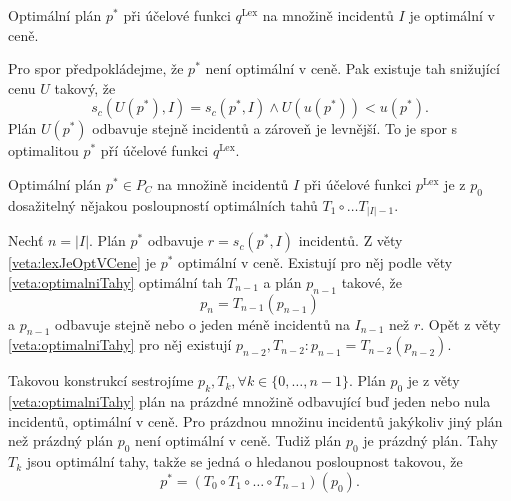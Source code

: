 \begin{veta}\label{veta:lexJeOptVCene}
  Optimální plán $p^*$ při účelové funkci $q^{\text{Lex}}$ na množině incidentů $I$ je optimální v ceně.
\end{veta}
\begin{dukaz}
  Pro spor předpokládejme, že $p^*$ není optimální v ceně.
  Pak existuje tah snižující cenu $U$ takový, že
  \begin{equation*}
    s_c(U(p^*), I) = s_c(p^*, I) \land U(u(p^*)) < u(p^*).
  \end{equation*}
  Plán $U(p^*)$ odbavuje stejně incidentů a zároveň je levnější.
  To je spor s optimalitou $p^*$ pří účelové funkci $q^{\text{Lex}}$.
\end{dukaz}

\begin{veta}\label{veta:dosazitelnostOptimalnimiTahy}
  Optimální plán $p^* \in P_C$ na množině incidentů $I$ při účelové funkci $p^{\text{Lex}}$ je z $p_0$ dosažitelný nějakou posloupností optimálních tahů $T_1 \circ \dots T_{|I|-1}$.
\end{veta}
\begin{dukaz}
  Nechť $n = |I|$.
  Plán $p^*$ odbavuje $r = s_c(p^*, I)$ incidentů.
  Z věty \ref{veta:lexJeOptVCene} je $p^*$ optimální v ceně.
  Existují pro něj podle věty \ref{veta:optimalniTahy} optimální tah $T_{n-1}$ a plán $p_{n-1}$ takové, že
  \begin{equation*}
    p_n = T_{n-1}(p_{n-1})
  \end{equation*}
  a $p_{n-1}$ odbavuje stejně nebo o jeden méně incidentů na $I_{n-1}$ než $r$.
  Opět z věty \ref{veta:optimalniTahy} pro něj existují $p_{n-2}, T_{n-2} \colon p_{n-1} = T_{n-2}(p_{n-2})$.

  Takovou konstrukcí sestrojíme $p_{k}, T_{k}, \forall k \in \{ 0, \dots, n-1 \}$. 
  Plán $p_0$ je z věty \ref{veta:optimalniTahy} plán na prázdné množině odbavující buď jeden nebo nula incidentů, optimální v ceně.
  Pro prázdnou množinu incidentů jakýkoliv jiný plán než prázdný plán $p_0$ není optimální v ceně.
  Tudiž plán $p_0$ je prázdný plán.
  Tahy $T_k$ jsou optimální tahy, takže se jedná o hledanou posloupnost takovou, že
  \begin{equation*}
    p^* = (T_0 \circ T_1 \circ \dots \circ T_{n-1})(p_0).
  \end{equation*}
\end{dukaz}

